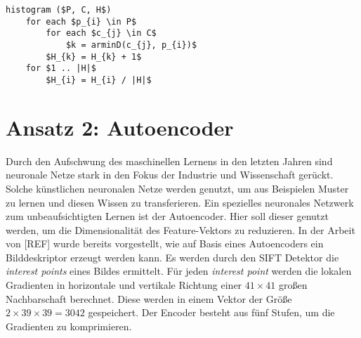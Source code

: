 \begin{lstlisting}[mathescape=true]
histogram ($P, C, H$)
	for each $p_{i} \in P$
		for each $c_{j} \in C$
			$k = arminD(c_{j}, p_{i})$ 
		$H_{k} = H_{k} + 1$		
	for $1 .. |H|$
		$H_{i} = H_{i} / |H|$
\end{lstlisting}

\section{Ansatz 2: Autoencoder}

Durch den Aufschwung des maschinellen Lernens in den letzten Jahren sind neuronale Netze stark in den Fokus der Industrie und Wissenschaft gerückt. Solche künstlichen neuronalen Netze werden genutzt, um aus Beispielen Muster zu lernen und diesen Wissen zu transferieren. 
Ein spezielles neuronales Netzwerk zum unbeaufsichtigten Lernen ist der Autoencoder. Hier soll dieser genutzt werden, um die Dimensionalität des Feature-Vektors zu reduzieren. In der Arbeit von [REF] wurde bereits vorgestellt, wie auf Basis eines Autoencoders ein Bilddeskriptor erzeugt werden kann. Es werden durch den SIFT Detektor die \textit{interest points} eines Bildes ermittelt. Für jeden \textit{interest point} werden die lokalen Gradienten in horizontale und vertikale Richtung einer $41 \times 41$ großen Nachbarschaft berechnet. Diese werden in einem Vektor der Größe $2 \times 39 \times 39 = 3042$ gespeichert. Der Encoder besteht aus fünf Stufen, um die Gradienten zu komprimieren.


